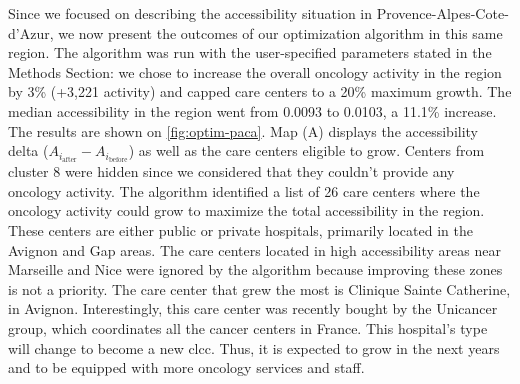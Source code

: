 Since we focused on describing the accessibility situation in Provence-Alpes-Cote-d'Azur, we now present the outcomes of our optimization algorithm in this same region. The algorithm was run with the user-specified parameters stated in the Methods Section: we chose to increase the overall oncology activity in the region by 3\% (+3,221 activity) and capped care centers to a 20\% maximum growth. The median accessibility in the region went from 0.0093 to 0.0103, a 11.1\% increase. The results are shown on \cref{fig:optim-paca}. Map (A) displays the accessibility delta ($A_{i_\text{after}} - A_{i_\text{before}}$) as well as the care centers eligible to grow. Centers from cluster 8 were hidden since we considered that they couldn't provide any oncology activity. The algorithm identified a list of 26 care centers where the oncology activity could grow to maximize the total accessibility in the region. These centers are either public or private hospitals, primarily located in the Avignon and Gap areas. The care centers located in high accessibility areas near Marseille and Nice were ignored by the algorithm because improving these zones is not a priority. The care center that grew the most is Clinique Sainte Catherine, in Avignon. Interestingly, this care center was recently bought by the Unicancer group, which coordinates all the cancer centers in France. This hospital's type will change to become a new \ac{clcc}. Thus, it is expected to grow in the next years and to be equipped with more oncology services and staff.

